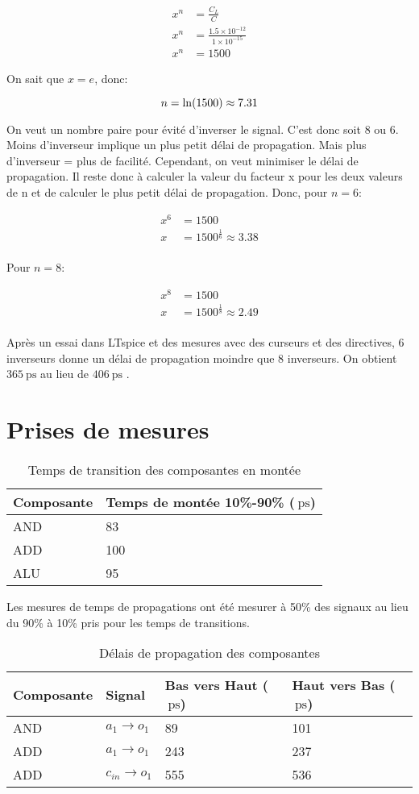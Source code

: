 \documentclass[a11paper]{article}
\newcommand{\quicktab}[4]{
  \begin{table}[H]
    \centering
    \caption{#1}
    \label{tab:#2}
    \begin{tabular}{#3}
      #4
    \end{tabular}
  \end{table}
}
\begin{document}
\begin{align}
  x^n &= \frac{C_L}{C} \\
  x^n &= \frac{1.5\times10^{-12}}{1\times10^{-15}} \\
  x^n &= 1500
\end{align}

On sait que $x=e$, donc:

\begin{equation}
n=\ln(1500) \approx7.31 \\
\end{equation}

On veut un nombre paire pour évité d'inverser le signal. C'est donc soit $8$ ou $6$.
Moins d'inverseur implique un plus petit délai de propagation. Mais plus d'inverseur = plus de facilité. Cependant, on veut minimiser le délai de propagation.
Il reste donc à calculer la valeur du facteur x pour les deux valeurs de n et de calculer le plus petit délai de propagation.
Donc, pour $n=6$:

\begin{align}
  x^6 &=1500 \\
  x &=1500^{\frac{1}{6}} \approx3.38 \\
\end{align}

Pour $n=8$:

\begin{align}
  x^8 &= 1500 \\
  x   &= 1500^{\frac{1}{8}} \approx 2.49 \\
\end{align}

Après un essai dans LTspice et des mesures avec des curseurs et des directives,
6 inverseurs donne un délai de propagation moindre que 8 inverseurs.
On obtient $\SI{365}{\pico\s}$ au lieu de $\SI{406}{\pico\s}$ .

\section{Prises de mesures}

\quicktab{Temps de transition des composantes en montée}{ttLH-Sortie}{ll}{
\toprule
Composante & Temps de montée 10\%-90\% ($\SI{}{\pico\s}$) \\
\midrule
AND & 83 \\
ADD & 100 \\ %
ALU & 95 \\
\bottomrule
}

Les mesures de temps de propagations ont été mesurer à 50\% des signaux au lieu du 90\% à 10\% pris pour les temps de transitions.

\quicktab{Délais de propagation des composantes}{propagation}{llll}{
\toprule
Composante & Signal & Bas vers Haut ($\SI{}{\pico\s}$) & Haut vers Bas ($\SI{}{\pico\s}$) \\
\midrule
AND & $a_1 \rightarrow o_1$ & 89 & 101 \\
ADD & $a_1 \rightarrow o_1$ & 243 & 237 \\
ADD & $c_{in} \rightarrow o_1$ & 555 & 536 \\
\bottomrule
}




\end{document}
